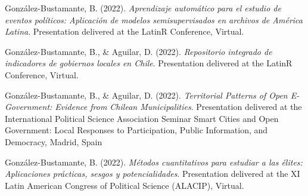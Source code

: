 \begin{publications}
\begin{benumerate}{87}
\item{González-Bustamante, B. (2022). {\itshape Aprendizaje automático para el estudio de eventos políticos: Aplicación de modelos semisupervisados en archivos de América Latina}. Presentation delivered at the LatinR Conference, Virtual.}\vspace{1mm}


\item{González-Bustamante, B., \& Aguilar, D. (2022). {\itshape Repositorio integrado de indicadores de gobiernos locales en Chile}. Presentation delivered at the LatinR Conference, Virtual.}\vspace{1mm}

\item{González-Bustamante, B., \& Aguilar, D. (2022). {\itshape Territorial Patterns of Open E-Government: Evidence from Chilean Municipalities}. Presentation delivered at the International Political Science Association Seminar Smart Cities and Open Government: Local Responses to Participation, Public Information, and Democracy, Madrid, Spain}\vspace{1mm}


\item{González-Bustamante, B. (2022). {\itshape Métodos cuantitativos para estudiar a las élites: Aplicaciones prácticas, sesgos y potencialidades}. Presentation delivered at the XI Latin American Congress of Political Science (ALACIP), Virtual.}\vspace{1mm}



\end{benumerate}
\end{publications}
